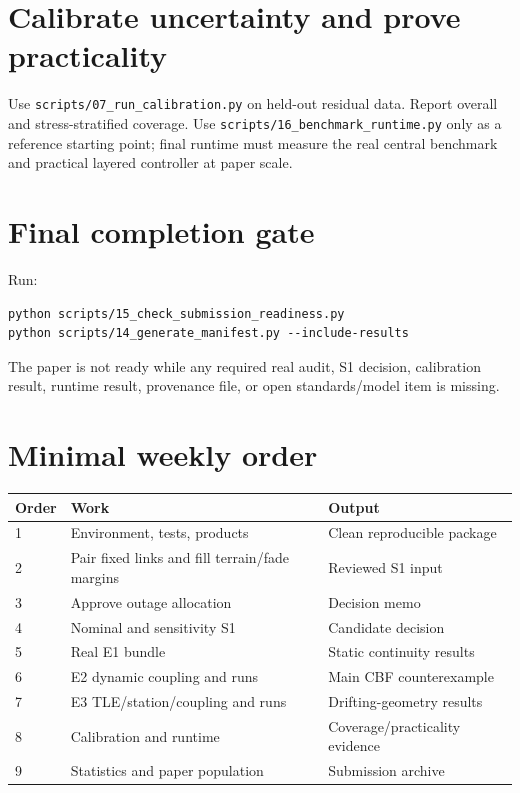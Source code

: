 \documentclass[11pt]{article}
\begin{document}
\section{Calibrate uncertainty and prove practicality}

Use \texttt{scripts/07\_run\_calibration.py} on held-out residual data. Report overall and stress-stratified coverage. Use \texttt{scripts/16\_benchmark\_runtime.py} only as a reference starting point; final runtime must measure the real central benchmark and practical layered controller at paper scale.

\section{Final completion gate}

Run:
\begin{verbatim}
python scripts/15_check_submission_readiness.py
python scripts/14_generate_manifest.py --include-results
\end{verbatim}

The paper is not ready while any required real audit, S1 decision, calibration result, runtime result, provenance file, or open standards/model item is missing.

\section{Minimal weekly order}

\begin{longtable}{p{}p{}p{}}
\toprule
Order & Work & Output\\
\midrule
1 & Environment, tests, products & Clean reproducible package\\
2 & Pair fixed links and fill terrain/fade margins & Reviewed S1 input\\
3 & Approve outage allocation & Decision memo\\
4 & Nominal and sensitivity S1 & Candidate decision\\
5 & Real E1 bundle & Static continuity results\\
6 & E2 dynamic coupling and runs & Main CBF counterexample\\
7 & E3 TLE/station/coupling and runs & Drifting-geometry results\\
8 & Calibration and runtime & Coverage/practicality evidence\\
9 & Statistics and paper population & Submission archive\\
\bottomrule
\end{longtable}
\end{document}
